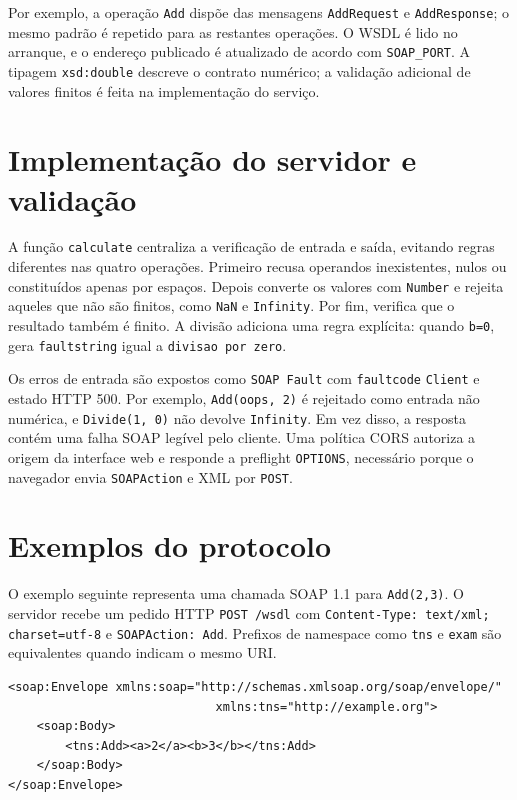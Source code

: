 \documentclass[11pt,a4paper]{article}
\begin{document}
Por exemplo, a operação \texttt{Add} dispõe das mensagens \texttt{AddRequest} e \texttt{AddResponse}; o mesmo padrão é repetido para as restantes operações. O WSDL é lido no arranque, e o endereço publicado é atualizado de acordo com \verb|SOAP_PORT|. A tipagem \texttt{xsd:double} descreve o contrato numérico; a validação adicional de valores finitos é feita na implementação do serviço.

\section{Implementação do servidor e validação}
A função \texttt{calculate} centraliza a verificação de entrada e saída, evitando regras diferentes nas quatro operações. Primeiro recusa operandos inexistentes, nulos ou constituídos apenas por espaços. Depois converte os valores com \texttt{Number} e rejeita aqueles que não são finitos, como \texttt{NaN} e \texttt{Infinity}. Por fim, verifica que o resultado também é finito. A divisão adiciona uma regra explícita: quando \texttt{b=0}, gera \texttt{faultstring} igual a \texttt{divisao por zero}.

Os erros de entrada são expostos como \texttt{SOAP Fault} com \texttt{faultcode} \texttt{Client} e estado HTTP 500. Por exemplo, \texttt{Add(oops, 2)} é rejeitado como entrada não numérica, e \texttt{Divide(1, 0)} não devolve \texttt{Infinity}. Em vez disso, a resposta contém uma falha SOAP legível pelo cliente. Uma política CORS autoriza a origem da interface web e responde a preflight \texttt{OPTIONS}, necessário porque o navegador envia \texttt{SOAPAction} e XML por \texttt{POST}.

\section{Exemplos do protocolo}
O exemplo seguinte representa uma chamada SOAP 1.1 para \texttt{Add(2,3)}. O servidor recebe um pedido HTTP \texttt{POST /wsdl} com \texttt{Content-Type: text/xml; charset=utf-8} e \texttt{SOAPAction: Add}. Prefixos de namespace como \texttt{tns} e \texttt{exam} são equivalentes quando indicam o mesmo URI.

{\small\begin{verbatim}
<soap:Envelope xmlns:soap="http://schemas.xmlsoap.org/soap/envelope/"
							 xmlns:tns="http://example.org">
	<soap:Body>
		<tns:Add><a>2</a><b>3</b></tns:Add>
	</soap:Body>
</soap:Envelope>
\end{verbatim}}
\end{document}
